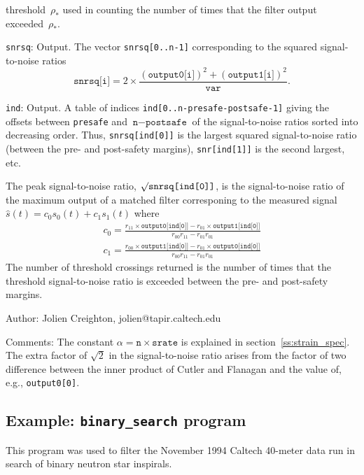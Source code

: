 \begin{description}
  threshold~$\rho_\ast$ used in counting the number of times that the filter
  output exceeded~$\rho_\ast$.
\item{\texttt{snrsq}}: Output.  The vector \texttt{snrsq[0..n-1]}
  corresponding to the squared signal-to-noise ratios
  \[
    \texttt{snrsq[i]} = 2\times
      \frac{(\texttt{output0[i]})^2 + (\texttt{output1[i]})^2}{\texttt{var}}.
  \]
\item{\texttt{ind}}: Output.  A table of indices
  \texttt{ind[0..n-presafe-postsafe-1]} giving the offsets between
  \texttt{presafe} and $\texttt{n}-\texttt{postsafe}$ of the signal-to-noise
  ratios sorted into decreasing order.  Thus,
  \texttt{snrsq[ind[0]]} is the largest squared signal-to-noise ratio
  (between the pre- and post-safety margins), \texttt{snr[ind[1]]} is the
  second largest, etc.
\end{description}
The peak signal-to-noise ratio, $\surd\texttt{snrsq[ind[0]]}$, is the
signal-to-noise ratio of the maximum output of a matched filter corresponing
to the measured signal
$\hat{s}(t)=c_0 s_0(t)+c_1 s_1(t)$ where
\begin{equation}
  \begin{array}{l}
    c_0 = \displaystyle\frac{r_{11}\times\texttt{output0[ind[0]]}
      -r_{01}\times\texttt{output1[ind[0]]}}{r_{00}r_{11}-r_{01}r_{01}}\\[12pt]
    c_1 = \displaystyle\frac{r_{00}\times\texttt{output1[ind[0]]}
      -r_{01}\times\texttt{output0[ind[0]]}}{r_{00}r_{11} - r_{01}r_{01}}
  \end{array}
\end{equation}
The number of threshold crossings returned is the number of times that the
threshold signal-to-noise ratio is exceeded between the pre- and post-safety
margins.

\begin{description}
\item{Author:} Jolien Creighton, jolien@tapir.caltech.edu
\item{Comments:} The constant $\alpha=\texttt{n}\times\texttt{srate}$ is
  explained in section~\ref{ss:strain_spec}.  The extra factor of $\surd 2$
  in the signal-to-noise ratio arises from the factor of two difference
  between the inner product of Cutler and Flanagan and the value of, e.g.,
  \texttt{output0[0]}.
\end{description}


\clearpage
\subsection{Example: \texttt{binary\_search} program}
This program was used to filter the November 1994 Caltech 40-meter data
run in search of binary neutron star inspirals.

